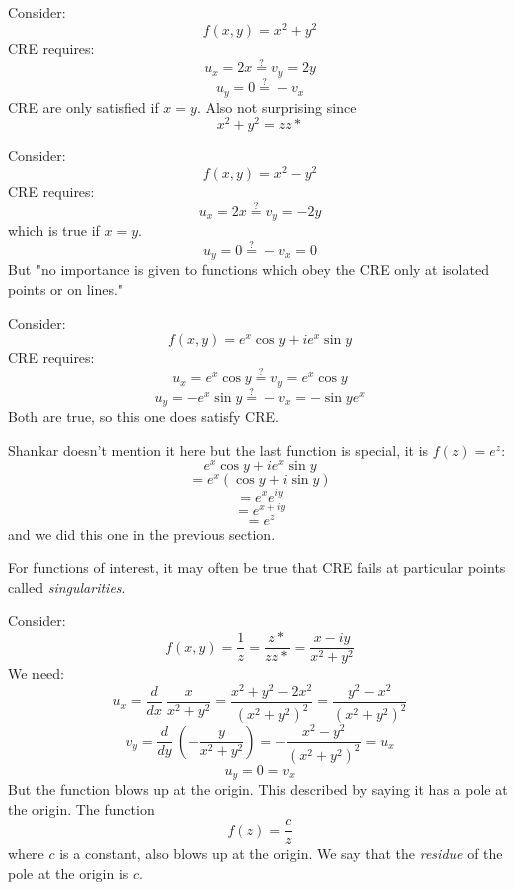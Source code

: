 \documentclass[11pt, oneside]{article}
\begin{document}
Consider:
\[ f(x,y) = x^2 + y^2 \]
CRE requires:
\[ u_x = 2x \stackrel{?}{=}  v_y = 2y \]
\[ u_y = 0 \stackrel{?}{=}  -v_x \]
CRE are only satisfied if $x=y$.  Also not surprising since
\[ x^2 + y^2 = zz* \]

Consider:
\[ f(x,y) = x^2 - y^2 \]
CRE requires:
\[ u_x = 2x \stackrel{?}{=} v_y = -2y \]
which is true if $x = y$.
\[ u_y = 0 \stackrel{?}{=} -v_x = 0 \]
But "no importance is given to functions which obey the CRE only at isolated points or on lines."

Consider:
\[ f(x,y) = e^x \cos y + i e^x \sin y \]
CRE requires:
\[ u_x = e^x \cos y \stackrel{?}{=} v_y = e^x \cos y \]
\[ u_y = -e^x \sin y \stackrel{?}{=} -v_x = - \sin y e^x \]
Both are true, so this one does satisfy CRE.

Shankar doesn't mention it here but the last function is special, it is $f(z) = e^z$:
\[ e^x \cos y + i e^x \sin y \]
\[ = e^x (\cos y + i \sin y) \]
\[ = e^x e^{iy} \]
\[ = e^{x + iy} \]
\[ = e^z \]
and we did this one in the previous section.

For functions of interest, it may often be true that CRE fails at particular points called \emph{singularities}.

Consider:
\[ f(x,y) = \frac{1}{z} = \frac{z*}{zz*} = \frac{x-iy}{x^2 + y^2} \]
We need:
\[ u_x = \frac{d}{dx} \ \frac{x}{x^2 + y^2} = \frac{x^2 + y^2 - 2x^2}{(x^2 + y^2)^2}  = \frac{y^2 - x^2}{(x^2 + y^2)^2} \]
\[ v_y = \frac{d}{dy} \ (-\frac{y}{x^2 + y^2} ) = - \frac{x^2 - y^2}{(x^2 + y^2)^2} = u_x \]
\[ u_y =  0 = v_x \]
But the function blows up at the origin.  This described by saying it has a pole at the origin.
The function
\[ f(z) = \frac{c}{z} \]
where $c$ is a constant, also blows up at the origin.  We say that the \emph{residue} of the pole at the origin is $c$.
\end{document}
